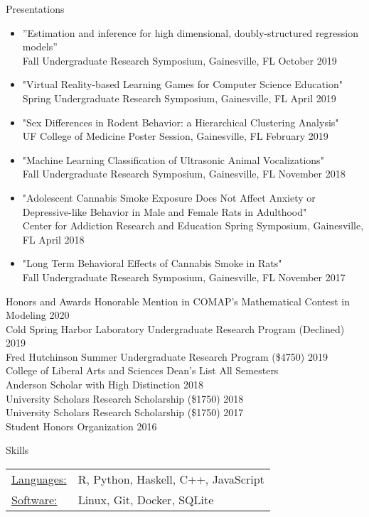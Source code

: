 \documentclass{resume}
\begin{document}
\begin{rSection}{Presentations}
  \begin{itemize} %
    \item ''Estimation and inference for high dimensional,
      doubly-structured regression models'' \\ Fall Undergraduate
      Research Symposium, Gainesville, FL \hfill October 2019
      \item "Virtual Reality-based Learning Games for Computer Science Education" \\ Spring Undergraduate Research Symposium, Gainesville, FL \hfill April 2019 
      \item "Sex Differences in Rodent Behavior: a Hierarchical Clustering Analysis" \\ UF College of Medicine Poster Session, Gainesville, FL \hfill February 2019
      \item "Machine Learning Classification of Ultrasonic Animal Vocalizations" \\Fall Undergraduate Research Symposium, Gainesville, FL \hfill November 2018
      \item "Adolescent Cannabis Smoke Exposure Does Not Affect Anxiety or Depressive-like Behavior in Male and Female Rats in Adulthood"\\Center for Addiction Research and Education Spring Symposium, Gainesville, FL \hfill April 2018
      \item"Long Term Behavioral Effects of Cannabis Smoke in Rats"\\Fall Undergraduate Research Symposium, Gainesville, FL \hfill November 2017
  \end{itemize}
  \end{rSection}

  \begin{rSection}{Honors and Awards}
  Honorable Mention in COMAP's Mathematical
  Contest in Modeling \hfill 2020 \\
Cold Spring Harbor Laboratory Undergraduate Research Program (Declined) \hfill 2019 \\
Fred Hutchinson Summer Undergraduate Research Program (\$4750) \hfill 2019 \\
College of Liberal Arts and Sciences Dean's List \hfill All Semesters \\
  Anderson Scholar with High Distinction \hfill 2018 \\
  University Scholars Research Scholarship (\$1750) \hfill 2018 \\
  University Scholars Research Scholarship (\$1750) \hfill 2017 \\
Student Honors Organization \hfill 2016 
 \end{rSection}

\begin{rSection}{Skills}
   \begin{tabular}{l p{3in}}
    \underline{Languages:} & R, Python, Haskell, C++, JavaScript \\
     \underline{Software:} & Linux, Git, Docker, SQLite
 \end{tabular}
\end{rSection}
\end{document}
